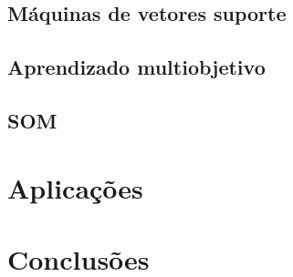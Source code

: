 \documentclass[conference]{IEEEtran}
\begin{document}
	\subsection{Máquinas de vetores suporte}
	\subsection{Aprendizado multiobjetivo}

	\subsection{SOM}
	
	\section{Aplicações}
	
	\section{Conclusões}

\end{document}
